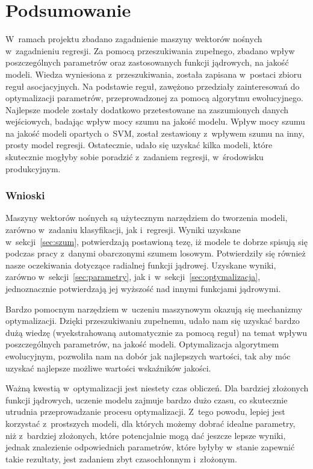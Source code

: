 \section{Podsumowanie}
\label{sec:podsumowanie}

W~ramach projektu zbadano zagadnienie maszyny wektorów nośnych w~zagadnieniu regresji. Za pomocą przeszukiwania zupełnego, zbadano wpływ poszczególnych parametrów oraz zastosowanych funkcji jądrowych, na jakość modeli. Wiedza wyniesiona z~przeszukiwania, została zapisana w~postaci zbioru reguł asocjacyjnych. Na podstawie reguł, zawężono przedziały zainteresowań do optymalizacji parametrów, przeprowadzonej za pomocą algorytmu ewolucyjnego. Najlepsze modele zostały dodatkowo przetestowane na zaszumionych danych wejściowych, badając wpływ mocy szumu na jakość modelu. Wpływ mocy szumu na jakość modeli opartych o~SVM, został zestawiony z~wpływem szumu na inny, prosty model regresji. Ostatecznie, udało się uzyskać kilka modeli, które skutecznie mogłyby sobie poradzić z~zadaniem regresji, w~środowisku produkcyjnym.


\subsubsection{Wnioski}
\label{subsec:wnioski}
Maszyny wektorów nośnych są użytecznym narzędziem do tworzenia modeli, zarówno w~zadaniu klasyfikacji, jak i~regresji. Wyniki uzyskane w~sekcji~\ref{sec:szum}, potwierdzają postawioną tezę, iż modele te dobrze spisują się podczas pracy z~danymi obarczonymi szumem losowym. Potwierdziły się również nasze oczekiwania dotyczące radialnej funkcji jądrowej. Uzyskane wyniki, zarówno w~sekcji~\ref{sec:parametry}, jak i~w~sekcji~\ref{sec:optymalizacja}, jednoznacznie potwierdzają jej wyższość nad innymi funkcjami jądrowymi.

Bardzo pomocnym narzędziem w~uczeniu maszynowym okazują się mechanizmy optymalizacji. Dzięki przeszukiwaniu zupełnemu, udało nam się uzyskać bardzo dużą wiedzę (wyekstrahowaną automatycznie za pomocą reguł) na temat wpływu poszczególnych parametrów, na jakość modeli. Optymalizacja algorytmem ewolucyjnym, pozwoliła nam na dobór jak najlepszych wartości, tak aby móc uzyskać najlepsze możliwe wartości wskaźników jakości. 

Ważną kwestią w~optymalizacji jest niestety czas obliczeń. Dla bardziej złożonych funkcji jądrowych, uczenie modelu zajmuje bardzo dużo czasu, co skutecznie utrudnia przeprowadzanie procesu optymalizacji. Z~tego powodu, lepiej jest korzystać z~prostszych modeli, dla których możemy dobrać idealne parametry, niż z~bardziej złożonych, które potencjalnie mogą dać jeszcze lepsze wyniki, jednak znalezienie odpowiednich parametrów, które byłyby w~stanie zapewnić takie rezultaty, jest zadaniem zbyt czasochłonnym i~złożonym.
